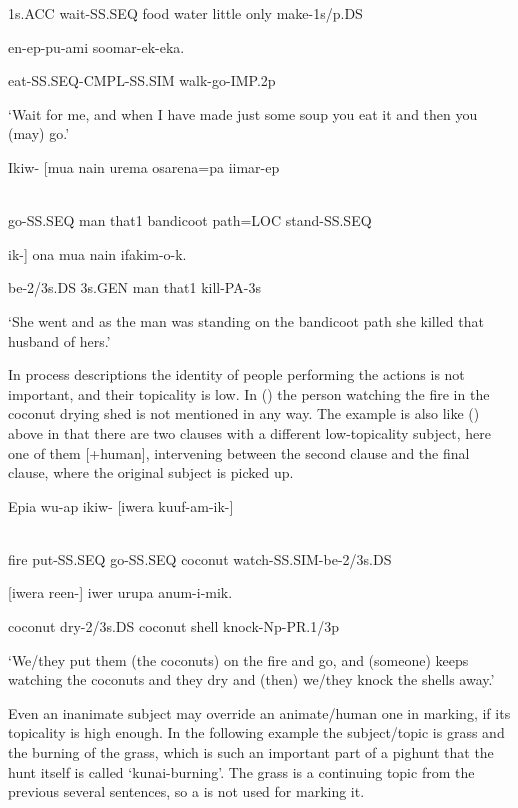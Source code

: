 1s.ACC  wait-SS.SEQ  food  water  little  only  make-1s/p.DS

en-ep-pu-ami  soomar-ek-eka.

eat-SS.SEQ-CMPL-SS.SIM  walk-go-IMP.2p

`Wait for me, and when I have made just some soup you eat it and then you (may) go.'

\ea%
\label{ex:x1478}
\gll Ikiw-  [mua  nain  urema  osarena=pa  iimar-ep  \\
      \\
\glt
\z

go-SS.SEQ  man  that1  bandicoot  path=LOC  stand-SS.SEQ  

ik-]  ona  mua  nain  ifakim-o-k.

be-2/3s.DS  3s.GEN  man  that1  kill-PA-3s

`She went and as the man was standing on the bandicoot path she killed that husband of hers.'

In process descriptions the identity of people performing the actions is not important, and their topicality is low. In () the person watching the fire in the coconut drying shed is not mentioned in any way. The example is also like () above in that there are two clauses with a different low-topicality subject, here one of them [+human], intervening between the second  clause and the final clause, where the original subject is picked up.

\ea%
\label{ex:x1481}
\gll Epia  wu-ap  ikiw-  [iwera  kuuf-am-ik-]  \\
      \\
\glt
\z

fire  put-SS.SEQ  go-SS.SEQ  coconut  watch-SS.SIM-be-2/3s.DS

[iwera  reen-]  iwer  urupa  anum-i-mik.

coconut  dry-2/3s.DS  coconut  shell  knock-Np-PR.1/3p

`We/they put them (the coconuts) on the fire and go, and (someone) keeps watching the coconuts and they dry and (then) we/they knock the shells away.'

Even an inanimate subject may override an animate/human one in  marking, if its topicality is high enough. In the following example the subject/topic is  grass and the burning of the grass, which is such an important part of a pighunt that the hunt itself is called  `kunai-burning'.  The grass is a continuing topic from the previous several sentences, so a  is not used for marking it. 

